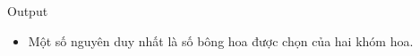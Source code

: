Output
\begin{itemize}
	\item     Một số nguyên duy nhất là số bông hoa được chọn của hai khóm hoa.   
\end{itemize}